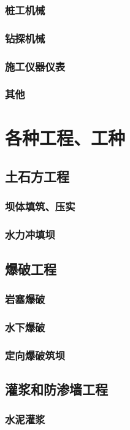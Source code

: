\documentclass[UTF8]{../../ApplicationUniverse}
\begin{document}
        \subsubsection{桩工机械}
        \subsubsection{钻探机械}
        \subsubsection{施工仪器仪表}
        \subsubsection{其他}
\section{各种工程、工种}
    \subsection{土石方工程}
        \subsubsection{坝体填筑、压实}
        \subsubsection{水力冲填坝}
    \subsection{爆破工程}
        \subsubsection{岩塞爆破}
        \subsubsection{水下爆破}
        \subsubsection{定向爆破筑坝}
    \subsection{灌浆和防渗墙工程}
        \subsubsection{水泥灌浆}
\end{document}
